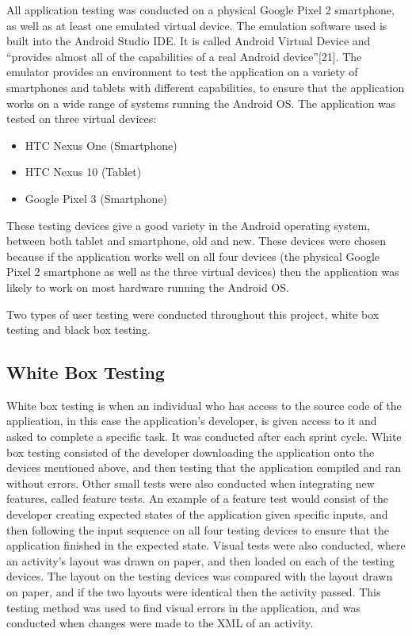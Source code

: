 \documentclass{article}
\begin{document}
All application testing was conducted on a physical Google Pixel 2 smartphone, as well as at least one emulated virtual device. The emulation software used is built into the Android Studio IDE. It is called Android Virtual Device and ``provides almost all of the capabilities of a real Android device''[21]. The emulator provides an environment to test the application on a variety of smartphones and tablets with different capabilities, to ensure that the application works on a wide range of systems running the Android OS. The application was tested on three virtual devices: 

\begin{itemize}
	\item HTC Nexus One (Smartphone)
	\item HTC Nexus 10 (Tablet)
	\item Google Pixel 3 (Smartphone)
\end{itemize}

These testing devices give a good variety in the Android operating system, between both tablet and smartphone, old and new. These devices were chosen because if the application works well on all four devices (the physical Google Pixel 2 smartphone as well as the three virtual devices) then the application was likely to work on most hardware running the Android OS.\par

Two types of user testing were conducted throughout this project, white box testing and black box testing. \par 

\subsection{White Box Testing}

White box testing is when an individual who has access to the source code of the application, in this case the application's developer, is given access to it and asked to complete a specific task. It was conducted after each sprint cycle. White box testing consisted of the developer downloading the application onto the devices mentioned above, and then testing that the application compiled and ran without errors. Other small tests were also conducted when integrating new features, called feature tests. An example of a feature test would consist of the developer creating expected states of the application given specific inputs, and then following the input sequence on all four testing devices to ensure that the application finished in the expected state. Visual tests were also conducted, where an activity's layout was drawn on paper, and then loaded on each of the testing devices. The layout on the testing devices was compared with the layout drawn on paper, and if the two layouts were identical then the activity passed. This testing method was used to find visual errors in the application, and was conducted when changes were made to the XML of an activity. \par
\end{document}

